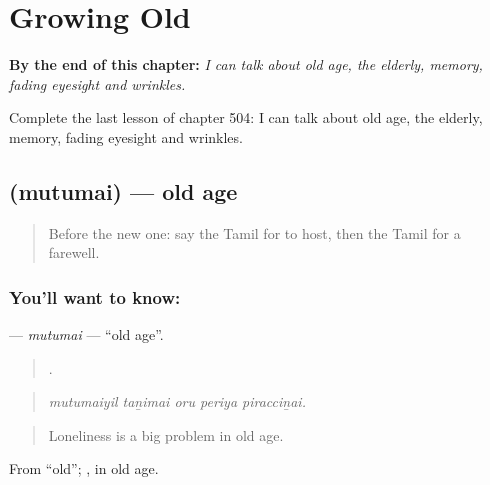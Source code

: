 
\chapter{Growing Old}
\label{ch:ta-growing-old}

\begin{chapteropening}
\textbf{By the end of this chapter:} \emph{I can talk about old age, the elderly, memory, fading eyesight and wrinkles.}

Complete the last lesson of chapter 504: I can talk about old age, the elderly, memory, fading eyesight and wrinkles.
\end{chapteropening}

\section[\texorpdfstring{\ta{முதுமை} (mutumai)}{முதுமை (mutumai)}]{ (mutumai) — old age}

\label{lesson:TA-C504-mutumai}



\begin{quote}
Before the new one: say the Tamil for to host, then the Tamil for a farewell.
\end{quote}

\subsection*{You'll want to know: }
\textbf{} — \emph{mutumai} — \textquotedblleft{}old age\textquotedblright{}.

\begin{quote}
    .
\end{quote}

\begin{quote}
\emph{mutumaiyil taṉimai oru periya piracciṉai.}
\end{quote}

\begin{quote}
Loneliness is a big problem in old age.
\end{quote}

From  \textquotedblleft{}old\textquotedblright{}; , in old age.

